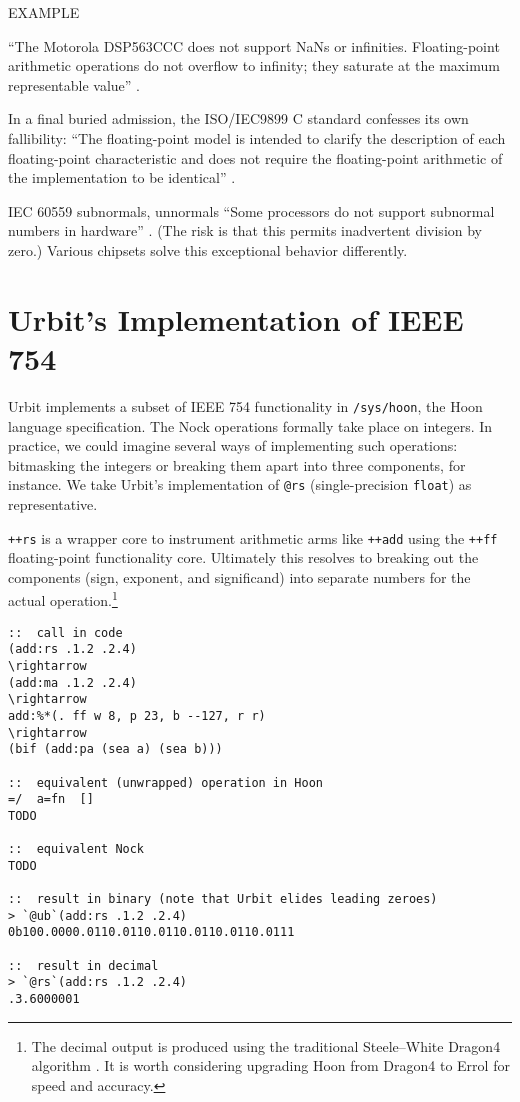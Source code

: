 \documentclass[twoside]{article}
\begin{document}
EXAMPLE

“The Motorola DSP563CCC does not support NaNs or infinities.  Floating-point arithmetic operations do not overflow to infinity; they saturate at the maximum representable value” \citep[p.~338]{Jones2008}.

In a final buried admission, the ISO/IEC9899 C standard confesses its own fallibility:  “The floating-point model is intended to clarify the description of each floating-point characteristic and does not require the floating-point arithmetic of the implementation to be identical” \citep[fn.~21]{ISO/IEC9899:2018}.

IEC 60559
subnormals, unnormals
“Some processors do not support subnormal numbers in hardware” \citep[p.~338]{Jones2008}.  (The risk is that this permits inadvertent division by zero.)  Various chipsets solve this exceptional behavior differently.

\section{Urbit's Implementation of IEEE 754}

Urbit implements a subset of IEEE 754 functionality in \texttt{/sys/hoon}, the Hoon language specification.  The Nock operations formally take place on integers.  In practice, we could imagine several ways of implementing such operations:  bitmasking the integers or breaking them apart into three components, for instance.  We take Urbit's implementation of \texttt{@rs} (single-precision \texttt{float}) as representative.

\texttt{++rs} is a wrapper core to instrument arithmetic arms like \texttt{++add} using the \texttt{++ff} floating-point functionality core.  Ultimately this resolves to breaking out the components (sign, exponent, and significand) into separate numbers for the actual operation.\footnote{The decimal output is produced using the traditional Steele–White Dragon4 algorithm \citep{Steele1991}.  It is worth considering upgrading Hoon from Dragon4 to Errol \citep{Andrysco2016} for speed and accuracy.}

\lstset{language=Hoon}
\begin{lstlisting}
::  call in code
(add:rs .1.2 .2.4)
\rightarrow
(add:ma .1.2 .2.4)
\rightarrow
add:%*(. ff w 8, p 23, b --127, r r)
\rightarrow
(bif (add:pa (sea a) (sea b)))

::  equivalent (unwrapped) operation in Hoon
=/  a=fn  []
TODO

::  equivalent Nock
TODO

::  result in binary (note that Urbit elides leading zeroes)
> `@ub`(add:rs .1.2 .2.4)  
0b100.0000.0110.0110.0110.0110.0110.0111

::  result in decimal
> `@rs`(add:rs .1.2 .2.4)  
.3.6000001
\end{lstlisting}
\end{document}

